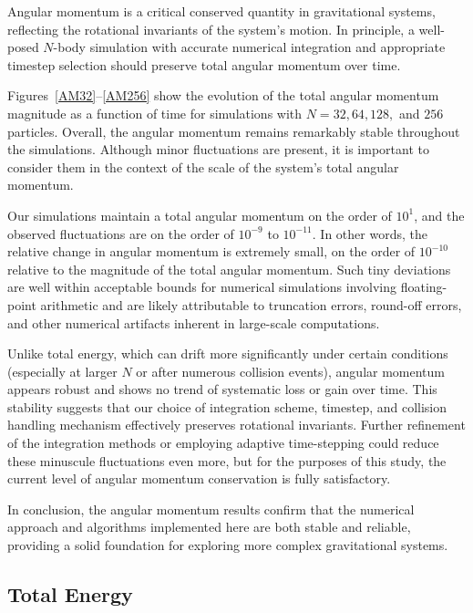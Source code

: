 \documentclass[a4paper, 12pt, oneside, onecolumn]{article}
\begin{document}
\begin{multicols}{2}

Angular momentum is a critical conserved quantity in gravitational systems, reflecting the rotational invariants of the system’s motion. In principle, a well-posed $N$-body simulation with accurate numerical integration and appropriate timestep selection should preserve total angular momentum over time.

Figures~\ref{AM32}--\ref{AM256} show the evolution of the total angular momentum magnitude as a function of time for simulations with $N = 32, 64, 128,$ and $256$ particles. Overall, the angular momentum remains remarkably stable throughout the simulations. Although minor fluctuations are present, it is important to consider them in the context of the scale of the system’s total angular momentum.

Our simulations maintain a total angular momentum on the order of $10^1$, and the observed fluctuations are on the order of $10^{-9}$ to $10^{-11}$. In other words, the relative change in angular momentum is extremely small, on the order of $10^{-10}$ relative to the magnitude of the total angular momentum. Such tiny deviations are well within acceptable bounds for numerical simulations involving floating-point arithmetic and are likely attributable to truncation errors, round-off errors, and other numerical artifacts inherent in large-scale computations.

Unlike total energy, which can drift more significantly under certain conditions (especially at larger $N$ or after numerous collision events), angular momentum appears robust and shows no trend of systematic loss or gain over time. This stability suggests that our choice of integration scheme, timestep, and collision handling mechanism effectively preserves rotational invariants. Further refinement of the integration methods or employing adaptive time-stepping could reduce these minuscule fluctuations even more, but for the purposes of this study, the current level of angular momentum conservation is fully satisfactory.

In conclusion, the angular momentum results confirm that the numerical approach and algorithms implemented here are both stable and reliable, providing a solid foundation for exploring more complex gravitational systems.

\end{multicols}


\subsection{Total Energy}
\end{document}
